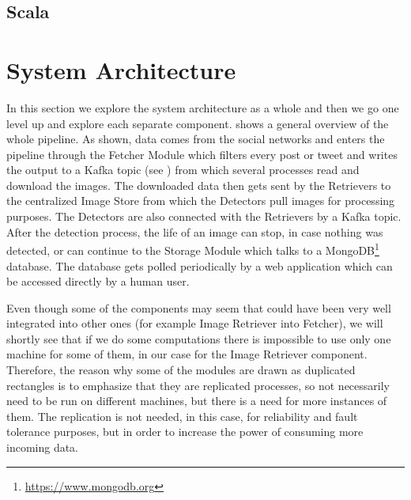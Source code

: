 
\subsection{Scala}
\label{sub-sec:scala}


\section{System Architecture}
\label{sec:sys-arch}

In this section we explore the system architecture as a whole and then we go
one level up and explore each separate component.
 shows a general overview of the whole
pipeline. As shown, data comes from the social networks and enters the
pipeline through the Fetcher Module which filters every post or tweet and
writes the output to a Kafka topic (see
) from which several processes read and
download the images. The downloaded data then gets sent by the Retrievers to
the centralized Image Store from which the Detectors pull images for
processing purposes. The Detectors are also connected with the Retrievers by a
Kafka topic. After the detection process, the life of an image can stop, in
case nothing was detected, or can continue to the Storage Module which talks
to a MongoDB\footnote{\url{https://www.mongodb.org}} database. The database
gets polled periodically by a web application which can be accessed directly by a human
user.


Even though some of the components may seem that could have been very well
integrated into other ones (for example Image Retriever into Fetcher), we will
shortly see that if we do some computations there is impossible to use only
one machine for some of them, in our case for the Image Retriever component.
Therefore, the reason why some of the modules are drawn as duplicated
rectangles is to emphasize that they are replicated processes, so not
necessarily need to be run on different machines, but there is a need for more
instances of them. The replication is not needed, in this case, for
reliability and fault tolerance purposes, but in order to increase the power
of consuming more incoming data.

